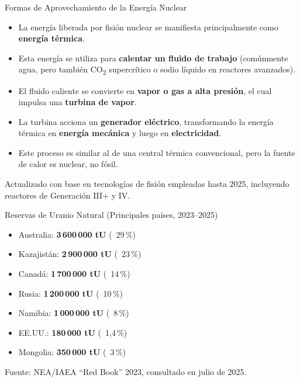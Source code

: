 \documentclass[main.tex]{subfiles}
\begin{document}
\begin{frame}{Formas de Aprovechamiento de la Energía Nuclear}
    \begin{itemize}
        \item La energía liberada por fisión nuclear se manifiesta principalmente como \textbf{energía térmica}.
        \item Esta energía se utiliza para \textbf{calentar un fluido de trabajo} (comúnmente agua, pero también CO\textsubscript{2} supercrítico o sodio líquido en reactores avanzados).
        \item El fluido caliente se convierte en \textbf{vapor o gas a alta presión}, el cual impulsa una \textbf{turbina de vapor}.
        \item La turbina acciona un \textbf{generador eléctrico}, transformando la energía térmica en \textbf{energía mecánica} y luego en \textbf{electricidad}.
        \item Este proceso es similar al de una central térmica convencional, pero la fuente de calor es nuclear, no fósil.
    \end{itemize}
    \vspace{0.5em}
    \small{Actualizado con base en tecnologías de fisión empleadas hasta 2025, incluyendo reactores de Generación III+ y IV.}
\end{frame}


\begin{frame}{Reservas de Uranio Natural (Principales países, 2023–2025)}
    \begin{itemize}
        \item Australia: \textbf{3\,600\,000 tU} (~29\,\%)
        \item Kazajistán: \textbf{2\,900\,000 tU} (~23\,\%)
        \item Canadá: \textbf{1\,700\,000 tU} (~14\,\%)
        \item Rusia: \textbf{1\,200\,000 tU} (~10\,\%)
        \item Namibia: \textbf{1\,000\,000 tU} (~8\,\%)
        \item EE.UU.: \textbf{180\,000 tU} (~1{,}4\,\%)
        \item Mongolia: \textbf{350\,000 tU} (~3\,\%)
    \end{itemize}
    \vspace{0.5em}
    \small{Fuente: NEA/IAEA “Red Book” 2023, consultado en julio de 2025.}
\end{frame}
\end{document}
